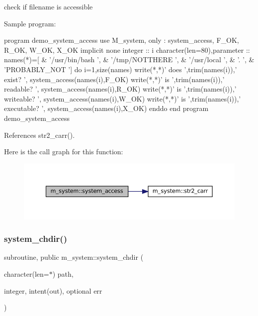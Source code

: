 check if filename is accessible \begin{DoxyVerb} Sample program:

    program demo_system_access
    use M_system, only : system_access, F_OK, R_OK, W_OK, X_OK
    implicit none
    integer                     :: i
    character(len=80),parameter :: names(*)=[ &
    '/usr/bin/bash   ', &
    '/tmp/NOTTHERE   ', &
    '/usr/local      ', &
    '.               ', &
    'PROBABLY_NOT    ']
    do i=1,size(names)
       write(*,*)' does ',trim(names(i)),' exist?    ', system_access(names(i),F_OK)
       write(*,*)' is ',trim(names(i)),' readable?     ', system_access(names(i),R_OK)
       write(*,*)' is ',trim(names(i)),' writeable?    ', system_access(names(i),W_OK)
       write(*,*)' is ',trim(names(i)),' executable?   ', system_access(names(i),X_OK)
    enddo
    end program demo_system_access \end{DoxyVerb}
 

References str2\+\_\+carr().

Here is the call graph for this function\+:\nopagebreak
\begin{figure}[H]
\begin{center}
\leavevmode
\includegraphics[width=350pt]{namespacem__system_a4c1c906730e61629a8277e1daeda90f6_cgraph}
\end{center}
\end{figure}
\mbox{\label{namespacem__system_a47746b670cb21bae0957c9bb2bccf209}} 
\subsubsection{\texorpdfstring{system\+\_\+chdir()}{system\_chdir()}}
{\footnotesize\ttfamily subroutine, public m\+\_\+system\+::system\+\_\+chdir (\begin{DoxyParamCaption}\item[{character(len=$\ast$)}]{path,  }\item[{integer, intent(out), optional}]{err }\end{DoxyParamCaption})}



